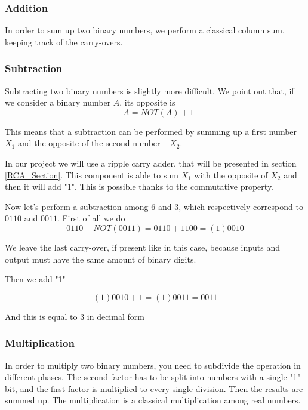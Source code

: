 \documentclass{article}
\begin{document}
\subsubsection{Addition}

In order to sum up two binary numbers, we perform a classical column sum, keeping track of the carry-overs.



\subsubsection{Subtraction}

Subtracting two binary numbers is slightly more difficult. We point out that, if we consider a binary number $A$, its opposite is
\[-A=NOT(A)+1\]

This means that a subtraction can be performed by summing up a first number $X_1$ and the opposite of the second number $-X_2$. 

\vspace{3mm}

In our project we will use a ripple carry adder, that will be presented in section \ref{RCA_Section}. This component is able to sum $X_1$ with the opposite of $X_2$ and then it will add "1". This is possible thanks to the commutative property.

\vspace{3mm}

Now let's perform a subtraction among $6$ and $3$, which respectively correspond to $0110$ and $0011$. First of all we do
\[0110+NOT(0011) = 0110 + 1100 = (1)0010\]

We leave the last carry-over, if present like in this case, because inputs and output must have the same amount of binary digits.

Then we add "1"

\[(1)0010+1=(1)0011 = 0011\]
  
And this is equal to 3 in decimal form



\subsubsection{Multiplication}

In order to multiply two binary numbers, you need to subdivide the operation in different phases. The second factor has to be split into numbers with a single "1" bit, and the first factor is multiplied to every single division. Then the results are summed up. The multiplication is a classical multiplication among real numbers. 
\end{document}
